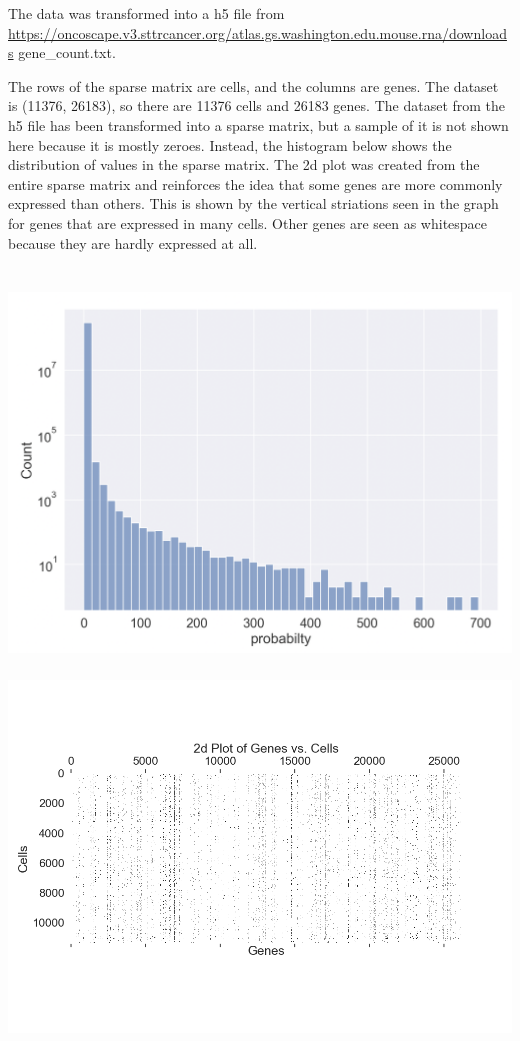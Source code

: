 \documentclass[
]{article}
\begin{document}
The data was transformed into a h5 file from
\url{https://oncoscape.v3.sttrcancer.org/atlas.gs.washington.edu.mouse.rna/downloads}
gene\_count.txt.

The rows of the sparse matrix are cells, and the columns are genes. The
dataset is (11376, 26183), so there are 11376 cells and 26183 genes. The
dataset from the h5 file has been transformed into a sparse matrix, but
a sample of it is not shown here because it is mostly zeroes. Instead,
the histogram below shows the distribution of values in the sparse
matrix. The 2d plot was created from the entire sparse matrix and
reinforces the idea that some genes are more commonly expressed than
others. This is shown by the vertical striations seen in the graph for
genes that are expressed in many cells. Other genes are seen as
whitespace because they are hardly expressed at all.

\hypertarget{section}{%
\section{\texorpdfstring{\protect\includegraphics{../analysis/eda/h5-plots/gene_count.png}}{}}\label{section}}

\includegraphics{../analysis/eda/h5-plots/2d-plot.png}
\end{document}
